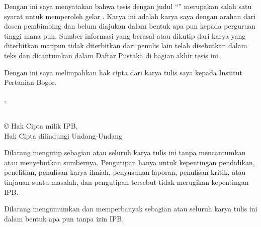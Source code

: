 

Dengan ini saya menyatakan bahwa tesis dengan judul
``\JudulTesis'' merupakan salah satu syarat untuk memperoleh gelar
\GelarMagister. Karya ini adalah karya saya dengan arahan dari dosen pembimbing
dan belum diajukan dalam bentuk apa pun kepada perguruan tinggi mana pun.
Sumber informasi yang berasal atau dikutip dari karya yang diterbitkan maupun
tidak diterbitkan dari penulis lain telah disebutkan dalam teks dan dicantumkan
dalam Daftar Pustaka di bagian akhir tesis ini.


Dengan ini saya melimpahkan hak cipta dari karya tulis saya kepada Institut
Pertanian Bogor.

\begin{flushright}
\KotaUniversitas, \BulanTahunDokumen\\[1.2cm]
\NamaPenulis\\
\NIM
\end{flushright}

\vfill

\begin{center}
{\fontsize{14pt}{17pt}\selectfont
\copyright{} Hak Cipta milik IPB, \Tahun\\
Hak Cipta dilindungi Undang-Undang\par}
\end{center}

Dilarang mengutip sebagian atau seluruh karya tulis ini tanpa mencantumkan
atau menyebutkan sumbernya. Pengutipan hanya untuk kepentingan pendidikan,
penelitian, penulisan karya ilmiah, penyusunan laporan, penulisan kritik, atau
tinjauan suatu masalah, dan pengutipan tersebut tidak merugikan kepentingan
IPB.

\vspace{10pt}

Dilarang mengumumkan dan memperbanyak sebagian atau seluruh karya tulis ini
dalam bentuk apa pun tanpa izin IPB.

\vspace*{24pt}
